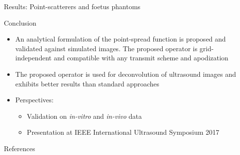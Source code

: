 {\begin{block}{Results: Point-scatterers and foetus phantoms}
\end{block}
\vfill


\begin{block}{Conclusion}
	\begin{itemize}
		\item An analytical formulation of the point-spread function is proposed and validated against simulated images. The proposed operator is grid-independent and compatible with any transmit scheme and apodization
		\item The proposed operator is used for deconvolution of ultrasound images and exhibits better results than standard approaches
		\item Perspectives:
		\begin{itemize}
			\item Validation on \textit{in-vitro} and \textit{in-vivo} data
			\item Presentation at IEEE International Ultrasound Symposium 2017
		\end{itemize}
	\end{itemize}
\end{block}
\vfill


\begin{block}{References}
	\printbibliography
\end{block}
}